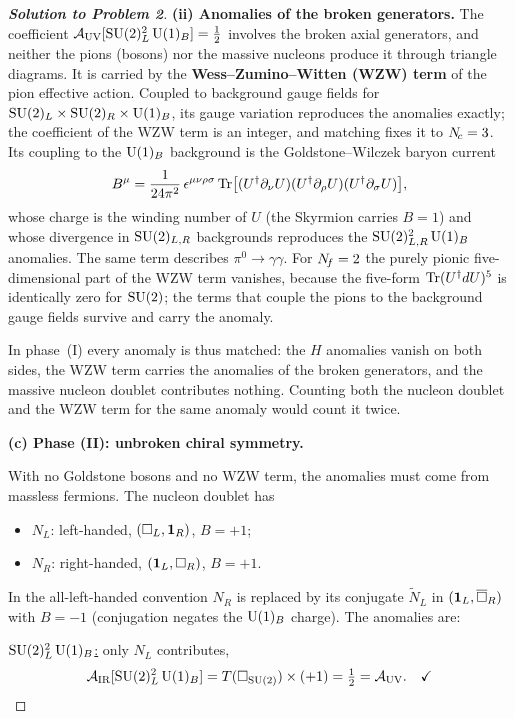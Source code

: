 \documentclass[11pt,a4paper]{article}
\begin{document}
\begin{proof}[\textbf{Solution to Problem 2}]
\textbf{(ii) Anomalies of the broken generators.}  The coefficient
$\mathcal{A}_{\mathrm{UV}}[\mathrm{SU}(2)_L^2\,\mathrm{U}(1)_B] = \tfrac{1}{2}$ involves the
broken axial generators, and neither the pions (bosons) nor the massive
nucleons produce it through triangle diagrams.  It is carried by the
\textbf{Wess--Zumino--Witten (WZW) term} of the pion effective action.
Coupled to background gauge fields for
$\mathrm{SU}(2)_L \times \mathrm{SU}(2)_R \times \mathrm{U}(1)_B$, its gauge variation
reproduces the \UV{} anomalies exactly; the coefficient of the WZW term
is an integer, and matching fixes it to $N_{\!c} = 3$.  Its coupling to the
$\mathrm{U}(1)_B$ background is the Goldstone--Wilczek baryon current
\begin{equation}
  B^\mu = \frac{1}{24\pi^2}\,\epsilon^{\mu\nu\rho\sigma}\,
  \mathrm{Tr}\bigl[(U^\dagger\partial_\nu U)(U^\dagger\partial_\rho U)
  (U^\dagger\partial_\sigma U)\bigr],
\end{equation}
whose charge is the winding number of $U$ (the Skyrmion carries $B = 1$)
and whose divergence in $\mathrm{SU}(2)_{L,R}$ backgrounds reproduces the
$\mathrm{SU}(2)_{L,R}^2\,\mathrm{U}(1)_B$ anomalies.  The same term describes
$\pi^0 \to \gamma\gamma$.  For $N_{\!f} = 2$ the purely pionic
five-dimensional part of the WZW term vanishes, because the five-form
$\mathrm{Tr}(U^\dagger dU)^5$ is identically zero for $\mathrm{SU}(2)$; the terms that
couple the pions to the background gauge fields survive and carry the
anomaly.

In phase~(I) every \UV{} anomaly is thus matched: the $H$ anomalies
vanish on both sides, the WZW term carries the anomalies of the broken
generators, and the massive nucleon doublet contributes nothing.
Counting both the nucleon doublet and the WZW term for the same anomaly
would count it twice.

\textbf{(c) Phase (II): unbroken chiral symmetry.}

With no Goldstone bosons and no WZW term, the anomalies must come from
massless fermions.  The nucleon doublet has
\begin{itemize}
  \item $N_L$: left-handed, $(\square_L, \mathbf{1}_R)$, $B = +1$;
  \item $N_R$: right-handed, $(\mathbf{1}_L, \square_R)$, $B = +1$.
\end{itemize}
In the all-left-handed convention $N_R$ is replaced by its conjugate
$\widetilde{N}_L$ in $(\mathbf{1}_L, \overline{\square}_R)$ with $B = -1$
(conjugation negates the $\mathrm{U}(1)_B$ charge).  The \IR{} anomalies are:

\underline{$\mathrm{SU}(2)_L^2\,\mathrm{U}(1)_B$:} only $N_L$ contributes,
\begin{equation}
  \mathcal{A}_{\mathrm{IR}}[\mathrm{SU}(2)_L^2\,\mathrm{U}(1)_B]
  = T(\square_{\mathrm{SU}(2)}) \times (+1)
  = \tfrac{1}{2}
  = \mathcal{A}_{\mathrm{UV}}. \quad\checkmark
\end{equation}


\end{proof}
\end{document}
